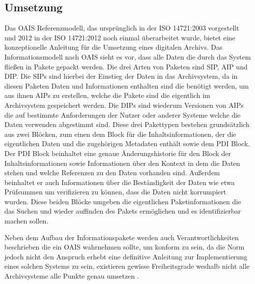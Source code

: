 \documentclass[conference,compsoc,final,a4paper]{IEEEtran}
\begin{document}
\subsection{Umsetzung}
Das \ac{OAIS} Referenzmodell, das ursprünglich in der ISO 14721:2003 vorgestellt und 2012 in der ISO 14721:2012 noch einmal überarbeitet wurde, bietet eine konzeptionelle Anleitung für die Umsetzung eines digitalen Archivs. Das Informationsmodell nach \ac{OAIS} sieht es vor, dass alle Daten die durch das System fließen in Pakete gepackt werden. Die drei Arten von Paketen sind \ac{SIP}, \ac{AIP} und \ac{DIP}. Die \ac{SIP}s sind hierbei der Einstieg der Daten in das Archivsystem, da in diesen Paketen Daten und Informationen enthalten sind die benötigt werden, um aus ihnen \ac{AIP}s zu erstellen, welche die Pakete sind die eigentlich im Archivsystem gespeichert werden. Die \ac{DIP}s sind wiederum Versionen von \ac{AIP}s die auf bestimmte Anforderungen der Nutzer oder anderer Systeme welche die Daten verwenden abgestimmt sind. Diese drei Pakettypen bestehen grundsätzlich aus zwei Blöcken, zum einen dem Block für die Inhaltsinformationen, der die eigentlichen Daten und die zugehörigen Metadaten enthält sowie dem \ac{PDI} Block. Der \ac{PDI} Block beinhaltet eine genaue Änderungshistorie für den Block der Inhaltsinformationen sowie Informationen über den Kontext in dem die Daten stehen und welche Referenzen zu den Daten vorhanden sind. Außerdem beinhaltet er auch Informationen über die Beständigkeit der Daten wie etwa Prüfsummen um verifizieren zu können, dass die Daten nicht korrumpiert wurden. Diese beiden Blöcke umgeben die eigentlichen Paketinformationen die das Suchen und wieder auffinden des Pakets ermöglichen und es identifizierbar machen sollen.

Neben dem Aufbau der Informationspakete werden auch Verantwortlichkeiten beschrieben die ein \ac{OAIS} wahrnehmen sollte, um konform zu sein, da die Norm jedoch nicht den Anspruch erhebt eine definitive Anleitung zur Implementierung eines solchen Systems zu sein, existieren gewisse Freiheitsgrade weshalb nicht alle Archivsysteme alle Punkte genau umsetzen \autocite{Ball2006}.

\end{document}

